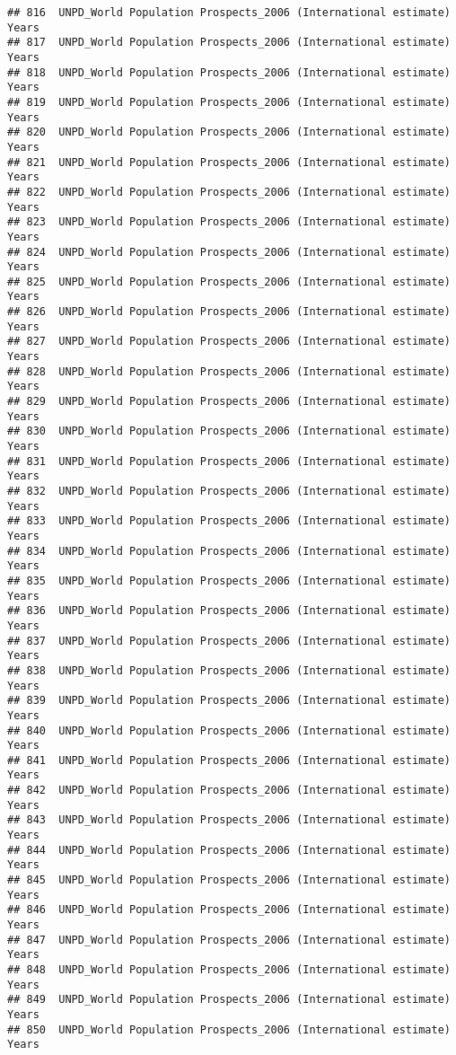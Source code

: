\documentclass[]{article}
\begin{document}
\begin{verbatim}
## 816  UNPD_World Population Prospects_2006 (International estimate) Years
## 817  UNPD_World Population Prospects_2006 (International estimate) Years
## 818  UNPD_World Population Prospects_2006 (International estimate) Years
## 819  UNPD_World Population Prospects_2006 (International estimate) Years
## 820  UNPD_World Population Prospects_2006 (International estimate) Years
## 821  UNPD_World Population Prospects_2006 (International estimate) Years
## 822  UNPD_World Population Prospects_2006 (International estimate) Years
## 823  UNPD_World Population Prospects_2006 (International estimate) Years
## 824  UNPD_World Population Prospects_2006 (International estimate) Years
## 825  UNPD_World Population Prospects_2006 (International estimate) Years
## 826  UNPD_World Population Prospects_2006 (International estimate) Years
## 827  UNPD_World Population Prospects_2006 (International estimate) Years
## 828  UNPD_World Population Prospects_2006 (International estimate) Years
## 829  UNPD_World Population Prospects_2006 (International estimate) Years
## 830  UNPD_World Population Prospects_2006 (International estimate) Years
## 831  UNPD_World Population Prospects_2006 (International estimate) Years
## 832  UNPD_World Population Prospects_2006 (International estimate) Years
## 833  UNPD_World Population Prospects_2006 (International estimate) Years
## 834  UNPD_World Population Prospects_2006 (International estimate) Years
## 835  UNPD_World Population Prospects_2006 (International estimate) Years
## 836  UNPD_World Population Prospects_2006 (International estimate) Years
## 837  UNPD_World Population Prospects_2006 (International estimate) Years
## 838  UNPD_World Population Prospects_2006 (International estimate) Years
## 839  UNPD_World Population Prospects_2006 (International estimate) Years
## 840  UNPD_World Population Prospects_2006 (International estimate) Years
## 841  UNPD_World Population Prospects_2006 (International estimate) Years
## 842  UNPD_World Population Prospects_2006 (International estimate) Years
## 843  UNPD_World Population Prospects_2006 (International estimate) Years
## 844  UNPD_World Population Prospects_2006 (International estimate) Years
## 845  UNPD_World Population Prospects_2006 (International estimate) Years
## 846  UNPD_World Population Prospects_2006 (International estimate) Years
## 847  UNPD_World Population Prospects_2006 (International estimate) Years
## 848  UNPD_World Population Prospects_2006 (International estimate) Years
## 849  UNPD_World Population Prospects_2006 (International estimate) Years
## 850  UNPD_World Population Prospects_2006 (International estimate) Years

\end{verbatim}
\end{document}
